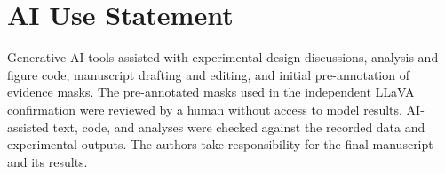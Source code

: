 \section*{AI Use Statement}

Generative AI tools assisted with experimental-design discussions, analysis and figure code, manuscript drafting and editing, and initial pre-annotation of evidence masks. The pre-annotated masks used in the independent LLaVA confirmation were reviewed by a human without access to model results. AI-assisted text, code, and analyses were checked against the recorded data and experimental outputs. The authors take responsibility for the final manuscript and its results.

